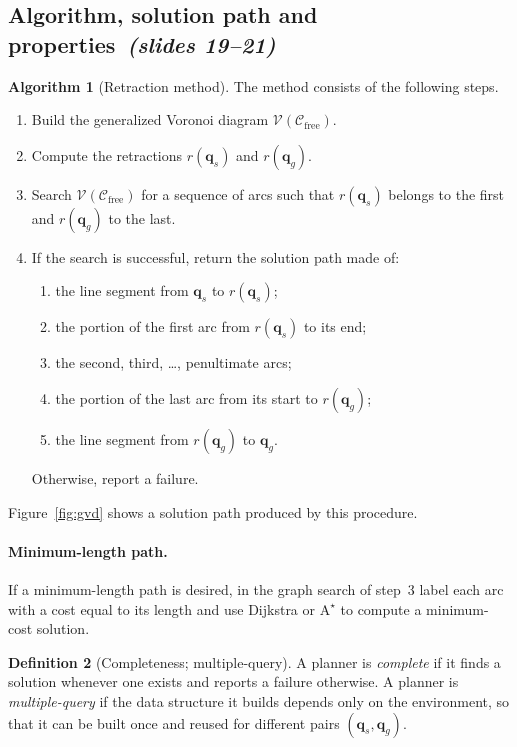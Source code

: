 \documentclass[11pt,a4paper]{article}
\newcommand{\Cfree}{\mathcal{C}_{\mathrm{free}}}
\newcommand{\Vor}{\mathcal{V}}
\newcommand{\qs}{\boldsymbol{q}_s}
\newcommand{\qg}{\boldsymbol{q}_g}
\newcommand{\slides}[1]{\emph{(slides #1)}}
\newcommand{\subsect}[2]{\subsection{#1\texorpdfstring{\ \slides{#2}}{ (slides #2)}}}
\theoremstyle{definition}
\newtheorem{definition}{Definition}[section]
\newtheorem{algorithm}[definition]{Algorithm}
\theoremstyle{plain}
\theoremstyle{remark}
\begin{document}
\subsect{Algorithm, solution path and properties}{19--21}

\begin{algorithm}[Retraction method]
\label{alg:retr}
The method consists of the following steps.
\begin{enumerate}
  \item Build the generalized Voronoi diagram $\Vor(\Cfree)$.
  \item Compute the retractions $r(\qs)$ and $r(\qg)$.
  \item Search $\Vor(\Cfree)$ for a sequence of arcs such that $r(\qs)$ belongs to the first and $r(\qg)$ to the last.
  \item If the search is successful, return the solution path made of:
  \begin{enumerate}[label=(\alph*)]
    \item the line segment from $\qs$ to $r(\qs)$;
    \item the portion of the first arc from $r(\qs)$ to its end;
    \item the second, third, \dots, penultimate arcs;
    \item the portion of the last arc from its start to $r(\qg)$;
    \item the line segment from $r(\qg)$ to $\qg$.
  \end{enumerate}
  Otherwise, report a failure.
\end{enumerate}
\end{algorithm}

Figure~\ref{fig:gvd} shows a solution path produced by this procedure.

\paragraph{Minimum-length path.} If a minimum-length path is desired, in the graph search of step~3 label each arc with a cost equal to its length and use Dijkstra or $\mathrm{A}^\star$ to compute a minimum-cost solution.

\begin{definition}[Completeness; multiple-query]
A planner is \emph{complete} if it finds a solution whenever one exists and reports a failure otherwise. A planner is \emph{multiple-query} if the data structure it builds depends only on the environment, so that it can be built once and reused for different pairs $(\qs,\qg)$.
\end{definition}
\end{document}
